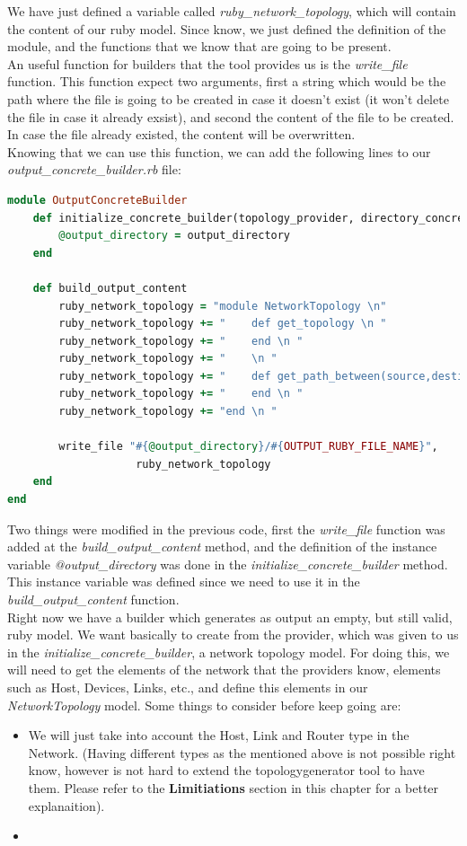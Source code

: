 We have just defined a variable called \textit{ruby\_network\_topology}, which will contain the content of our ruby model. Since know, we just defined the definition of the module, and the functions that we know that are going to be present. \\
An useful function for builders that the tool provides us is the \textit{write\_file} function. This function expect two arguments, first a string which would be the path where the file is going to be created in case it doesn't exist (it won't delete the file in case it already exsist), and second the content of the file to be created. In case the file already existed, the content will be overwritten.\\
Knowing that we can use this function, we can add the following lines to our \textit{output\_concrete\_builder.rb} file:

\begin{lstlisting}[language=Ruby,breaklines=true]
module OutputConcreteBuilder
	def initialize_concrete_builder(topology_provider, directory_concrete_builders, output_directory)
		@output_directory = output_directory
	end
    
    def build_output_content
    	ruby_network_topology = "module NetworkTopology \n"
    	ruby_network_topology += "    def get_topology \n "
    	ruby_network_topology += "    end \n "
    	ruby_network_topology += "    \n "
    	ruby_network_topology += "    def get_path_between(source,destination) \n "
    	ruby_network_topology += "    end \n "
    	ruby_network_topology += "end \n "
    	
    	write_file "#{@output_directory}/#{OUTPUT_RUBY_FILE_NAME}",
                    ruby_network_topology
    end
end
\end{lstlisting}

Two things were modified in the previous code, first the \textit{write\_file} function was added at the \textit{build\_output\_content} method, and the definition of the instance variable \textit{@output\_directory} was done in the \textit{initialize\_concrete\_builder} method. This instance variable was defined since we need to use it in the \textit{build\_output\_content} function. \\

Right now we have a builder which generates as output an empty, but still valid, ruby model. We want basically to create from the provider, which was given to us in the \textit{initialize\_concrete\_builder}, a network topology model. For doing this, we will need to get the elements of the network that the providers know, elements such as Host, Devices, Links, etc., and define this elements in our \textit{NetworkTopology} model. Some things to consider before keep going are: 
\begin{itemize}
\item We will just take into account the Host, Link and Router type in the Network. (Having different types as the mentioned above is not possible right know, however is not hard to extend the topologygenerator tool to have them. Please refer to the \textbf{Limitiations} section in this chapter for a better explanaition).
\item 
\end{itemize}

